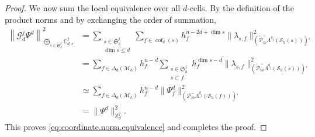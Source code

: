 \documentclass[10pt,a4paper]{amsart}
\newcommand{\FM}[1]{\Delta_{#1}}
\newcommand{\Mh}{\mathcal{M}_h}
\newcommand{\PLtrim}[2]{\mathcal{P}_{#1}^{-}\Lambda^{#2}}
\newcommand{\PLtrimz}[2]{\mathring{\mathcal P}_{#1}^{-}\Lambda^{#2}}
\newcommand{\Sh}{\mathcal{S}_h}
\newcommand{\cof}[1]{\operatorname{cof}_{#1}}
\begin{document}
\begin{proof}
We now sum the local equivalence over all $d$-cells.
By the definition of the product norms and by exchanging the order of summation,
\[
\begin{aligned}
\left\|
  \mathcal G_d^j\Psi^d
\right\|_{
  \bigoplus_{s\in\mathfrak S_h^j}
  \mathbb C_{d,s}^j
}^2
&=
\sum_{\substack{
  s\in\mathfrak S_h^j\\
  \dim s\leq d
}}
\sum_{f\in\cof{d}(s)}
h_f^{n-2d+\dim s}
\|\lambda_{s,f}\|_{
  \left(
    \PLtrimz{m}{q_j}(\Sh(s))
  \right)'
}^2
\\
&=
\sum_{f\in\FM{d}(\Mh)}
h_f^{n-d}
\sum_{\substack{
  s\in\mathfrak S_h^j\\
  s\subset f
}}
h_f^{\dim s-d}
\|\lambda_{s,f}\|_{
  \left(
    \PLtrimz{m}{q_j}(\Sh(s))
  \right)'
}^2
\\
&\simeq
\sum_{f\in\FM{d}(\Mh)}
h_f^{n-d}
\|\Psi_f^d\|_{
  \left(
    \PLtrim{m}{q_j}(\Sh(f))
  \right)'
}^2
\\
&=
\|\Psi^d\|_{\mathbb X_d^j}^2.
\end{aligned}
\]
This proves \eqref{eq:coordinate.norm.equivalence} and completes the proof.
\end{proof}
\end{document}
